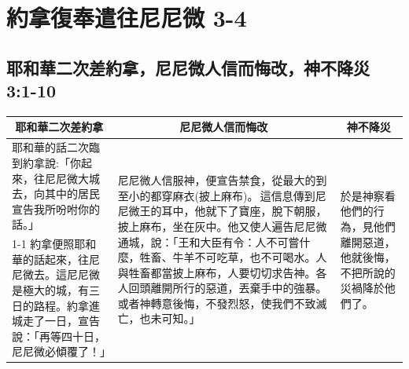 \section{約拿復奉遣往尼尼微 3-4}

\subsection{耶和華二次差約拿，尼尼微人信而悔改，神不降災 3:1-10}
\begin{table}[H]
\centering
\begin{tabular}{p{5.8cm}|p{8.7cm}|p{2.0cm}}\hline\hline
\multicolumn{1}{c|}{耶和華二次差約拿}&\multicolumn{1}{c|}{尼尼微人信而悔改}&\multicolumn{1}{c}{神不降災}\\\hline
耶和華的話二次臨到約拿說:「你起來，往尼尼微大城去，向其中的居民宣告我所吩咐你的話。」
&\multirow{2}{9cm}{尼尼微人信服神，便宣告禁食，從最大的到至小的都穿麻衣(披上麻布)。 這信息傳到尼尼微王的耳中，他就下了寶座，脫下朝服，披上麻布，坐在灰中。他又使人遍告尼尼微通城，說：「王和大臣有令：人不可嘗什麼，牲畜、牛羊不可吃草，也不可喝水。人與牲畜都當披上麻布，人要切切求告神。各人回頭離開所行的惡道，丟棄手中的強暴。或者神轉意後悔，不發烈怒，使我們不致滅亡，也未可知。」}
&\multirow{2}{2.2cm}{於是神察看他們的行為，見他們離開惡道，他就後悔，不把所說的災禍降於他們了。}\\\cline{1-1}
約拿便照耶和華的話起來，往尼尼微去。這尼尼微是極大的城，有三日的路程。約拿進城走了一日，宣告說：「再等四十日，尼尼微必傾覆了！」&&\\\hline
\end{tabular}
\end{table}
 



